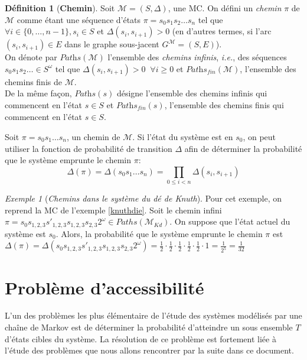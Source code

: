 \documentclass[12pt,a4paper]{report}
\theoremstyle{definition}%
\newtheorem{definition}{Définition}[chapter]
\theoremstyle{remark}
\newtheorem{example}{Exemple}[chapter]
\newcommand{\ie}{\textit{i.e.}, }
\begin{document}
\begin{definition}[\textbf{Chemin}]
	Soit $\mathcal{M} = (S, \Delta)$, une MC. On défini un \textit{chemin} $\pi$ de $\mathcal{M}$ comme étant une séquence d'états $\pi = s_0 s_1 s_2 \dots s_n$ tel que $\forall i \in \{0, \dots, n-1\}, s_i \in S$ et $\Delta(s_i, s_{i+1}) > 0$ (en d'autres termes, si l'arc $(s_i, s_{i+1}) \in E$ dans le graphe sous-jacent $G^\mathcal{M} = (S, E)$).%
	\\
	On dénote par $\textit{Paths}(\mathcal{M})$ l'ensemble des \textit{chemins infinis}, \ie des séquences $s_0 s_1 s_2 \dots \in S^\omega$ tel que $\Delta(s_i, s_{i+1}) > 0 \;\;\forall i \geq 0$ et $\textit{Paths}_\textit{fin}(\mathcal{M})$, l'ensemble des chemins finis de $\mathcal{M}$.\\
	De la même façon, $\textit{Paths}(s)$ désigne l'ensemble des chemins infinis qui commencent en l'état $s \in S$ et $\textit{Paths}_\textit{fin}(s)$, l'ensemble des chemins finis qui commencent en l'état $s \in S$.
\end{definition}

Soit $\pi = s_0 s_1 \dots s_n$, un chemin de $\mathcal{M}$. Si l'état du système est en $s_0$, on peut utiliser la fonction de probabilité de transition $\Delta$ afin de déterminer la probabilité que le système emprunte le chemin $\pi$: 
\[ \Delta(\pi) = \Delta(s_0 s_1 \dots s_n) = \prod_{0 \leq i < n} \Delta(s_i, s_{i+1}) \]

\begin{example}[\textit{Chemins dans le système du dé de Knuth}]
	Pour cet exemple, on reprend la MC de l'exemple \ref{knuthdie}. Soit le chemin infini $\pi = s_0 s_{1,2,3} s'_{1, 2, 3} s_{1,2,3} s_{2,3} 2^\omega \in Paths(\mathcal{M}_{Kd})$.
	On suppose que l'état actuel du système est $s_0$. Alors, la probabilité que le système emprunte le chemin $\pi$ est $\Delta(\pi) = \Delta(s_0 s_{1,2,3} s'_{1, 2, 3} s_{1,2,3} s_{2,3} 2^\omega) = \frac{1}{2} \cdot \frac{1}{2} \cdot \frac{1}{2} \cdot \frac{1}{2} \cdot \frac{1}{2} \cdot 1 = \frac{1}{2^5} = \frac{1}{32}$
\end{example}

\section{Problème d'accessibilité}

L'un des problèmes les plus élémentaire de l'étude des systèmes modélisés par une chaîne de Markov est de déterminer la probabilité d'atteindre un sous ensemble $T$ d'états cibles du système. La résolution de ce problème est fortement liée à l'étude des problèmes que nous allons rencontrer par la suite dans ce document.
\end{document}
